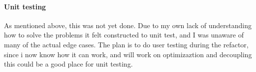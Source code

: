 \documentclass{article}
\begin{document}
\paragraph{Unit testing}
As mentioned above, this was not yet done. Due to my own lack of understanding how to solve the problems it felt constructed to unit test, and I was unaware of many of the actual edge cases. The plan is to do user testing during the refactor, since i now know how it can work, and will work on optimizaztion and decoupling this could be a good place for unit testing.


\end{document}
